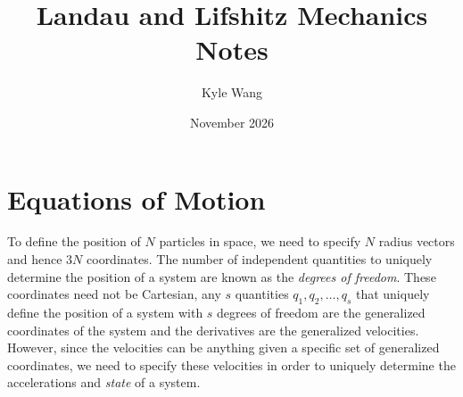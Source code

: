 \documentclass{article}
\title{Landau and Lifshitz Mechanics Notes}
\author{Kyle Wang}
\date{November 2026}
\theoremstyle{definition}
\theoremstyle{remark}
\begin{document}
\maketitle
\tableofcontents
\section{Equations of Motion}
To define the position of $N$ particles in space, we need to specify $N$ radius vectors and hence $3N$ coordinates. The number of independent quantities to uniquely determine the position of a system are known as the \emph{degrees of freedom}. These coordinates need not be Cartesian, any $s$ quantities $q_1,q_2,\ldots, q_s$ that uniquely define the position of a system with $s$ degrees of freedom are the generalized coordinates of the system and the derivatives are the generalized velocities. However, since the velocities can be anything given a specific set of generalized coordinates, we need to specify these velocities in order to uniquely determine the accelerations and \emph{state} of a system.
\end{document}
